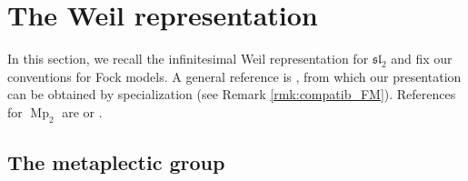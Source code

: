 \documentclass[reqno, 11pt]{amsart} %
\numberwithin{equation}{section}
\theoremstyle{plain}
\theoremstyle{definition}
\theoremstyle{remark}
\newcommand{\mfl}{\mathfrak{l}}
\newcommand{\mfs}{\mathfrak{s}}
\newcommand{\mfsl}{\mfs\mfl}
\DeclareMathOperator{\Mp}{Mp}
\begin{document}
\section{The Weil representation}

In this section, we recall the infinitesimal Weil representation for $\mfsl_2$ and fix our conventions for Fock models. A general reference is \cite[Appendix A]{FunkeMillson}, from which our presentation can be obtained by specialization (see Remark \ref{rmk:compatib_FM}). References for $\Mp_2$ are \cite[(1.6), (1.7)]{Kudla_Annals} or \cite[(11.1)]{Zhang_AFL}.

\subsection{The metaplectic group}
\end{document}

